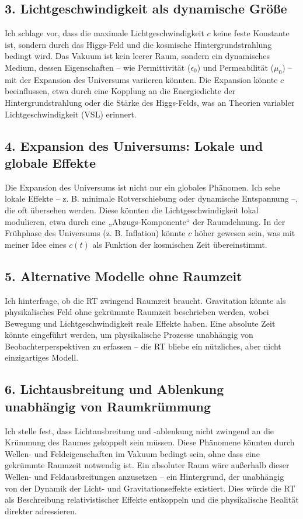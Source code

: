 \documentclass[a4paper,12pt]{article}
\begin{document}
	\subsection{3. Lichtgeschwindigkeit als dynamische Größe}
	Ich schlage vor, dass die maximale Lichtgeschwindigkeit \( c \) keine feste Konstante ist, sondern durch das Higgs-Feld und die kosmische Hintergrundstrahlung bedingt wird. Das Vakuum ist kein leerer Raum, sondern ein dynamisches Medium, dessen Eigenschaften – wie Permittivität (\( \epsilon_0 \)) und Permeabilität (\( \mu_0 \)) – mit der Expansion des Universums variieren könnten. Die Expansion könnte \( c \) beeinflussen, etwa durch eine Kopplung an die Energiedichte der Hintergrundstrahlung oder die Stärke des Higgs-Felds, was an Theorien variabler Lichtgeschwindigkeit (VSL) erinnert.
	
	\subsection{4. Expansion des Universums: Lokale und globale Effekte}
	Die Expansion des Universums ist nicht nur ein globales Phänomen. Ich sehe lokale Effekte – z. B. minimale Rotverschiebung oder dynamische Entspannung –, die oft übersehen werden. Diese könnten die Lichtgeschwindigkeit lokal modulieren, etwa durch eine „Abzugs-Komponente“ der Raumdehnung. In der Frühphase des Universums (z. B. Inflation) könnte \( c \) höher gewesen sein, was mit meiner Idee eines \( c(t) \) als Funktion der kosmischen Zeit übereinstimmt.
	
	\subsection{5. Alternative Modelle ohne Raumzeit}
	Ich hinterfrage, ob die RT zwingend Raumzeit braucht. Gravitation könnte als physikalisches Feld ohne gekrümmte Raumzeit beschrieben werden, wobei Bewegung und Lichtgeschwindigkeit reale Effekte haben. Eine absolute Zeit könnte eingeführt werden, um physikalische Prozesse unabhängig von Beobachterperspektiven zu erfassen – die RT bliebe ein nützliches, aber nicht einzigartiges Modell.
	
	\subsection{6. Lichtausbreitung und Ablenkung unabhängig von Raumkrümmung}
	Ich stelle fest, dass Lichtausbreitung und -ablenkung nicht zwingend an die Krümmung des Raumes gekoppelt sein müssen. Diese Phänomene könnten durch Wellen- und Feldeigenschaften im Vakuum bedingt sein, ohne dass eine gekrümmte Raumzeit notwendig ist. Ein absoluter Raum wäre außerhalb dieser Wellen- und Feldausbreitungen anzusetzen – ein Hintergrund, der unabhängig von der Dynamik der Licht- und Gravitationseffekte existiert. Dies würde die RT als Beschreibung relativistischer Effekte entkoppeln und die physikalische Realität direkter adressieren.
	
\end{document}
